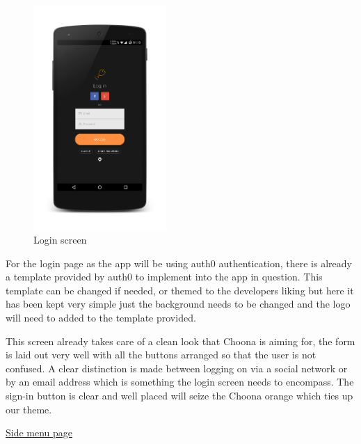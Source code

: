 \noindent
\begin{figure}[h!]
\centering
\includegraphics[width=0.45\textwidth]{./img/loginframed.png}
\caption{Login screen}
\label{fig:loginscreen}
\end{figure}

For the login page as the app will be using auth0 authentication, there is already a template provided by auth0 to implement into the app in question. This template can be changed if needed, or themed to the developers liking but here it has been kept very simple just the background needs to be changed and the logo will need to added to the template provided.

This screen already takes care of a clean look that Choona is aiming for, the form is laid out very well with all the buttons arranged so that the user is not confused. A clear distinction is made between logging on via a social network or by an email address which is something the login screen needs to encompass. The sign-in button is clear and well placed will seize the Choona orange which ties up our theme.\\

\clearpage

\noindent\underline{Side menu page}\newline

